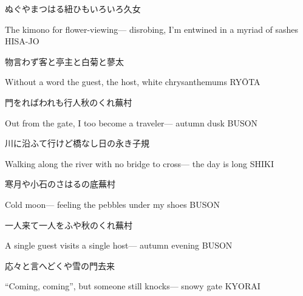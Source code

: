 \begin{haiku}
    {\FH {}ぬぐやまつはる紐{ひも}いろいろ}\hfill{\FH 久女}

    \vin{} The kimono for flower-viewing---
    \vin{} \vin{} disrobing, I'm entwined in
    \vin{} \vin{} \vin{} a myriad of sashes \hspace{\fill} HISA-JO
\end{haiku}

\begin{haiku}
    {\FH 物言わず客と亭主と白菊と}\hfill{\FH 蓼太}

    \vin{} Without a word
    \vin{} \vin{} the guest, the host,
    \vin{} \vin{} \vin{} white chrysanthemums \hspace{\fill} RY\={O}TA
\end{haiku}

\begin{haiku}
    {\FH 門をればわれも行人秋のくれ}\hfill{\FH 蕪村}

    \vin{} Out from the gate,
    \vin{} \vin{} I too become a traveler---
    \vin{} \vin{} \vin{} autumn dusk \hspace{\fill} BUSON
\end{haiku}

\begin{haiku}
    {\FH 川に沿ふて行けど橋なし日の永き}\hfill{\FH 子規}

    \vin{} Walking along the river
    \vin{} \vin{} with no bridge to cross---
    \vin{} \vin{} \vin{} the day is long \hspace{\fill} SHIKI
\end{haiku}

\begin{haiku}
    {\FH 寒月や小石のさはるの底}\hfill{\FH 蕪村}

    \vin{} Cold moon---
    \vin{} \vin{} feeling the pebbles
    \vin{} \vin{} \vin{} under my shoes \hspace{\fill} BUSON
\end{haiku}

\begin{haiku}
    {\FH 一人来て一人をふや秋のくれ}\hfill{\FH 蕪村}

    \vin{} A single guest
    \vin{} \vin{} visits a single host---
    \vin{} \vin{} \vin{} autumn evening \hspace{\fill} BUSON
\end{haiku}

\begin{haiku}
    {\FH 応々と言へどくや雪の門}\hfill{\FH 去来}

    \vin{} ``Coming, coming'',
    \vin{} \vin{} but someone still knocks---
    \vin{} \vin{} \vin{} snowy gate \hspace{\fill} KYORAI
\end{haiku}

